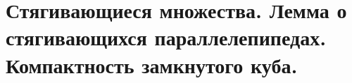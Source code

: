 \documentclass[../main.tex]{subfiles}
\begin{document}
\newpage
\section{Стягивающиеся множества. Лемма о стягивающихся параллелепипедах. Компактность замкнутого куба.}
\end{document}
